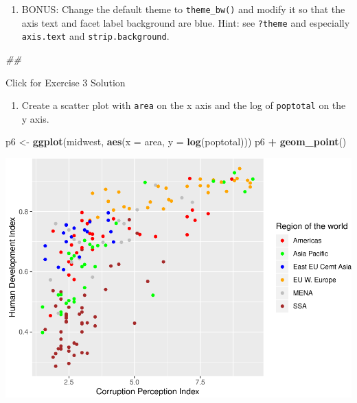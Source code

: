 \documentclass[
]{book}
\newenvironment{Shaded}{\begin{snugshade}}{\end{snugshade}}
\newcommand{\CommentTok}[1]{\textcolor[rgb]{0.56,0.35,0.01}{\textit{#1}}}
\newcommand{\DataTypeTok}[1]{\textcolor[rgb]{0.13,0.29,0.53}{#1}}
\newcommand{\KeywordTok}[1]{\textcolor[rgb]{0.13,0.29,0.53}{\textbf{#1}}}
\newcommand{\NormalTok}[1]{#1}
\newcommand{\OperatorTok}[1]{\textcolor[rgb]{0.81,0.36,0.00}{\textbf{#1}}}
\newcommand{\StringTok}[1]{\textcolor[rgb]{0.31,0.60,0.02}{#1}}
\providecommand{\tightlist}{%
  \setlength{\itemsep}{0pt}\setlength{\parskip}{0pt}}
\begin{document}
\begin{enumerate}
\def\labelenumi{\arabic{enumi}.}
\setcounter{enumi}{5}
\tightlist
\item
  BONUS: Change the default theme to \texttt{theme\_bw()} and modify it so that the axis text and facet label background are blue. Hint: see \texttt{?theme} and especially \texttt{axis.text} and \texttt{strip.background}.
\end{enumerate}

\begin{Shaded}
\begin{Highlighting}[]
\CommentTok{\#\# }
\end{Highlighting}
\end{Shaded}

{Click for Exercise 3 Solution}

\begin{alert}

\begin{enumerate}
\def\labelenumi{\arabic{enumi}.}
\tightlist
\item
  Create a scatter plot with \texttt{area} on the x axis and the log of \texttt{poptotal} on the y axis.
\end{enumerate}

\begin{Shaded}
\begin{Highlighting}[]
\NormalTok{p6 \textless{}{-}}\StringTok{ }\KeywordTok{ggplot}\NormalTok{(midwest, }\KeywordTok{aes}\NormalTok{(}\DataTypeTok{x =}\NormalTok{ area, }\DataTypeTok{y =} \KeywordTok{log}\NormalTok{(poptotal))) }
\NormalTok{p6 }\OperatorTok{+}\StringTok{ }\KeywordTok{geom\_point}\NormalTok{() }
\end{Highlighting}
\end{Shaded}

\includegraphics{R/Rgraphics/figures/unnamed-chunk-209-1.pdf}


\end{alert}
\end{document}
